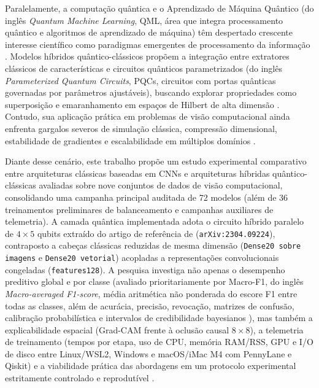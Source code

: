 \documentclass[
    12pt,
    openright,
    oneside,
    a4paper,
    english,
    brazil
]{abntex2}
\begin{document}
Paralelamente, a computação quântica e o Aprendizado de Máquina Quântico (do inglês \textit{Quantum Machine Learning}, QML, área que integra processamento quântico e algoritmos de aprendizado de máquina) têm despertado crescente interesse científico como paradigmas emergentes de processamento da informação \cite{nielsen2010quantum,biamonte2017qml,preskill2018nisq}. Modelos híbridos quântico-clássicos propõem a integração entre extratores clássicos de características e circuitos quânticos parametrizados (do inglês \textit{Parameterized Quantum Circuits}, PQCs, circuitos com portas quânticas governadas por parâmetros ajustáveis), buscando explorar propriedades como superposição e emaranhamento em espaços de Hilbert de alta dimensão \cite{cerezo2021variational,bergholm2018pennylane}. Contudo, sua aplicação prática em problemas de visão computacional ainda enfrenta gargalos severos de simulação clássica, compressão dimensional, estabilidade de gradientes e escalabilidade em múltiplos domínios \cite{mcclean2018barren,schuld2021effect}.

Diante desse cenário, este trabalho propõe um estudo experimental comparativo entre arquiteturas clássicas baseadas em CNNs e arquiteturas híbridas quântico-clássicas avaliadas sobre nove conjuntos de dados de visão computacional, consolidando uma campanha principal auditada de 72 modelos (além de 36 treinamentos preliminares de balanceamento e campanhas auxiliares de telemetria). A camada quântica implementada adota o circuito híbrido paralelo de \(4 \times 5\) qubits extraído do artigo de referência de  (\texttt{arXiv:2304.09224}), contraposto a cabeças clássicas reduzidas de mesma dimensão (\texttt{Dense20 sobre imagens} e \texttt{Dense20 vetorial}) acopladas a representações convolucionais congeladas (\texttt{features128}). A pesquisa investiga não apenas o desempenho preditivo global e por classe (avaliado prioritariamente por Macro-F1, do inglês \textit{Macro-averaged F1-score}, média aritmética não ponderada do escore F1 entre todas as classes, além de acurácia, precisão, revocação, matrizes de confusão, calibração probabilística e intervalos de credibilidade bayesianos \cite{sokolova2009systematic,fawcett2006roc,guo2017calibration,wang2019bayestest}), mas também a explicabilidade espacial (Grad-CAM frente à oclusão causal \(8 \times 8\)), a telemetria de treinamento (tempos por etapa, uso de CPU, memória RAM/RSS, GPU e I/O de disco entre Linux/WSL2, Windows e macOS/iMac M4 com PennyLane e Qiskit) e a viabilidade prática das abordagens em um protocolo experimental estritamente controlado e reprodutível \cite{Wazlawick2020}.
\end{document}

